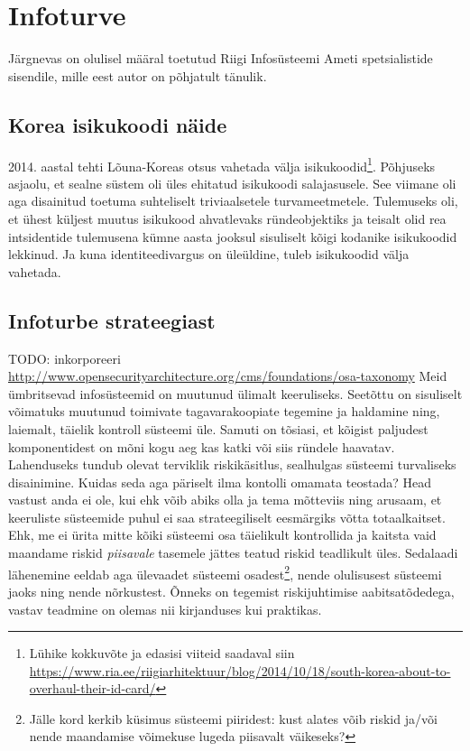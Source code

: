 \documentclass{article}
\begin{document}
\section{Infoturve}
Järgnevas on olulisel määral toetutud Riigi Infosüsteemi Ameti spetsialistide sisendile, mille eest autor on põhjatult tänulik.

\subsection{Korea isikukoodi näide}
2014. aastal tehti Lõuna-Koreas otsus vahetada välja isikukoodid\footnote{Lühike kokkuvõte ja edasisi viiteid saadaval siin \url{https://www.ria.ee/riigiarhitektuur/blog/2014/10/18/south-korea-about-to-overhaul-their-id-card/}}. Põhjuseks asjaolu, et sealne süstem oli üles ehitatud isikukoodi salajasusele. See viimane oli aga disainitud toetuma suhteliselt triviaalsetele turvameetmetele. Tulemuseks oli, et ühest küljest muutus isikukood ahvatlevaks ründeobjektiks ja teisalt olid rea intsidentide tulemusena kümne aasta jooksul sisuliselt kõigi kodanike isikukoodid lekkinud. Ja kuna identiteedivargus on üleüldine, tuleb isikukoodid välja vahetada.

\subsection{Infoturbe strateegiast}
TODO: inkorporeeri \url{http://www.opensecurityarchitecture.org/cms/foundations/osa-taxonomy}
Meid ümbritsevad infosüsteemid on muutunud ülimalt keeruliseks. Seetõttu on sisuliselt võimatuks muutunud toimivate tagavarakoopiate tegemine ja haldamine ning, laiemalt, täielik kontroll süsteemi üle. Samuti on tõsiasi, et kõigist paljudest komponentidest on mõni kogu aeg kas katki või siis ründele haavatav. Lahenduseks tundub olevat terviklik riskikäsitlus, sealhulgas süsteemi turvaliseks disainimine. Kuidas seda aga päriselt ilma kontolli omamata teostada? Head vastust anda ei ole, kui ehk võib abiks olla \cite{leveson2011engineering} ja tema mõtteviis ning arusaam, et keeruliste süsteemide puhul ei saa strateegiliselt eesmärgiks võtta totaalkaitset. Ehk, me ei ürita mitte kõiki süsteemi osa täielikult kontrollida ja kaitsta vaid maandame riskid \emph{piisavale} tasemele jättes teatud riskid teadlikult üles. Sedalaadi lähenemine eeldab aga ülevaadet süsteemi osadest\footnote{Jälle kord kerkib küsimus süsteemi piiridest: kust alates võib riskid ja/või nende maandamise võimekuse lugeda piisavalt väikeseks?}, nende olulisusest süsteemi jaoks ning nende nõrkustest. Õnneks on tegemist riskijuhtimise aabitsatõdedega, vastav teadmine on olemas nii kirjanduses kui praktikas. 
\end{document}
